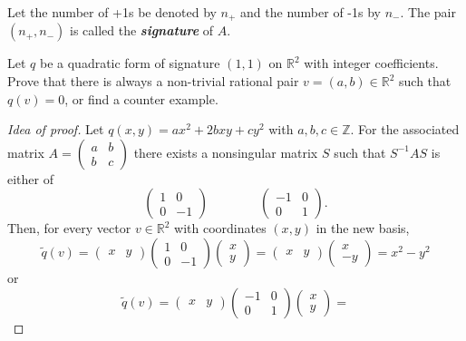 \documentclass{article}
\numberwithin{equation}{section}
\newcommand{\R}{\mathbb{R}}
\newcommand{\Z}{\mathbb{Z}}
\begin{document}
	\begin{defn}
		Let the number of +1s be denoted by $n_+$ and the number of -1s by $n_-$. The pair $(n_+,n_-)$ is called the \textbf{\textit{signature}} of $A$.
	\end{defn}
	\begin{exercise}
		Let $q$ be a quadratic form of signature $(1,1)$ on $\R^2$ with integer coefficients. Prove that there is always a non-trivial rational pair $v=(a,b)\in\R^2$ such that $q(v)=0$, or find a counter example.
	\end{exercise}
	\begin{proof}[Idea of proof]
		Let $q(x,y)=ax^2+2bxy+cy^2$ with $a,b,c\in\Z$. For the associated matrix $A=\begin{pmatrix}a&b\\b&c\end{pmatrix}$ there exists a nonsingular matrix $S$ such that $S^{-1}AS$ is either of
		\[\begin{pmatrix}
			1&0\\
			0&-1
		\end{pmatrix}\qquad\qquad\begin{pmatrix}
			-1&0\\
			0&1
		\end{pmatrix}.\]
		Then, for every vector $v\in\R^2$ with coordinates $(x,y)$ in the new basis,
		\[\tilde q(v)=\begin{pmatrix}
			x&y
		\end{pmatrix}\begin{pmatrix}
			1&0\\
			0&-1
		\end{pmatrix}\begin{pmatrix}
			x\\y
		\end{pmatrix}=
		\begin{pmatrix}
			x&y
		\end{pmatrix}
		\begin{pmatrix}
			x\\-y
		\end{pmatrix}=x^2-y^2\]
		or
		\[\tilde q(v)=\begin{pmatrix}
			x&y
		\end{pmatrix}\begin{pmatrix}
			-1&0\\
			0&1
		\end{pmatrix}\begin{pmatrix}
			x\\y
		\end{pmatrix}=
\]
\end{proof}
\end{document}
